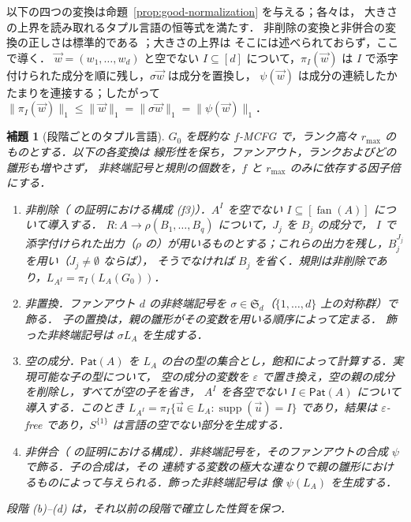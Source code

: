 \documentclass[11pt,a4paper]{ltjsarticle}
\numberwithin{equation}{section}
\theoremstyle{plain}
\newtheorem{lemma}[theorem]{補題}
\theoremstyle{definition}
\theoremstyle{remark}
\newcommand{\tuple}[1]{\vec{#1}}
\newcommand{\eps}{\varepsilon}
\newcommand{\fan}{\operatorname{fan}}
\theoremstyle{plain}
\begin{document}
以下の四つの変換は命題~\ref{prop:good-normalization} を与える；各々は，
大きさの上界を読み取れるタプル言語の恒等式を満たす．
非削除の変換と非併合の変換の正しさは標準的である
\cite{SekiEtAl1991,Kanazawa2019Ogden,Yoshinaka2011}；大きさの上界は
そこには述べられておらず，ここで導く．
$\tuple w=(w_1,\ldots,w_d)$ と空でない $I\subseteq[d]$ について，$\pi_I(\tuple w)$ は
$I$ で添字付けられた成分を順に残し，$\sigma\tuple w$ は成分を置換し，
$\psi(\tuple w)$ は成分の連続したかたまりを連接する；したがって
$\|\pi_I(\tuple w)\|_1\le\|\tuple w\|_1=\|\sigma\tuple w\|_1=\|\psi(\tuple w)\|_1$．

\begin{lemma}[段階ごとのタプル言語]
\label{lem:normalization-stages}
$G_0$ を既約な $f$-MCFG で，ランク高々 $r_{\max}$ のものとする．以下の各変換は
線形性を保ち，ファンアウト，ランクおよびどの雛形も増やさず，
非終端記号と規則の個数を，$f$ と $r_{\max}$ のみに依存する因子倍にする．
\begin{enumerate}[label=\textup{(\alph*)},leftmargin=*]
\item \emph{非削除}（
\cite[Lemma~2.2]{SekiEtAl1991} の証明における構成 (f3)）．$A^I$ を空でない $I\subseteq[\fan(A)]$ について導入する．
$R:A\to\rho(B_1,\ldots,B_q)$ について，$J_j$ を $B_j$ の成分で，
$I$ で添字付けられた出力（$\rho$ の）が用いるものとする；これらの出力を残し，$B_j^{J_j}$ を用い（$J_j\ne\emptyset$ ならば），
そうでなければ $B_j$ を省く．規則は非削除であり，$L_{A^I}=\pi_I(L_A(G_0))$．
\item \emph{非置換．}ファンアウト $d$ の非終端記号を
$\sigma\in\mathfrak S_d$（$\{1,\ldots,d\}$ 上の対称群）で飾る．
子の置換は，親の雛形がその変数を用いる順序によって定まる．
飾った非終端記号は $\sigma L_A$ を生成する．
\item \emph{空の成分．}$\mathsf{Pat}(A)$ を
$L_A$ の台の型の集合とし，飽和によって計算する．実現可能な子の型について，
空の成分の変数を $\eps$ で置き換え，空の親の成分を削除し，すべてが空の子を省き，
$A^I$ を各空でない $I\in\mathsf{Pat}(A)$ について導入する．このとき
$L_{A^I}=\pi_I\{\tuple u\in L_A:\operatorname{supp}(\tuple u)=I\}$ であり，結果は
$\eps$-free であり，$S^{\{1\}}$ は言語の空でない部分を生成する．
\item \emph{非併合}（
\cite[Section~2.3, Lemma~1]{Yoshinaka2011} の証明における構成）．非終端記号を，そのファンアウトの合成
$\psi$ で飾る．子の合成は，その
連続する変数の極大な連なりで親の雛形におけるものによって与えられる．飾った非終端記号は
像 $\psi(L_A)$ を生成する．
\end{enumerate}
段階 (b)--(d) は，それ以前の段階で確立した性質を保つ．
\end{lemma}
\end{document}
